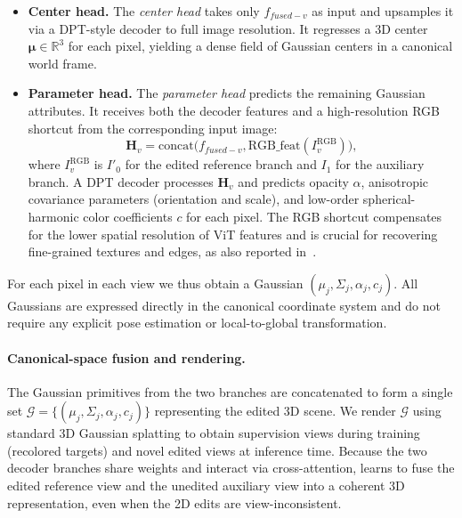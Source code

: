 \begin{itemize}
    \item \textbf{Center head.}
    The \emph{center head} takes only \(f_{fused-v}\) as input and upsamples it via a DPT-style decoder to full image resolution.
    It regresses a 3D center \(\boldsymbol{\mu} \in \mathbb{R}^3\) for each pixel, yielding a dense field of Gaussian centers in a canonical world frame.

    \item \textbf{Parameter head.}
    The \emph{parameter head} predicts the remaining Gaussian attributes.
    It receives both the decoder features and a high-resolution RGB shortcut from the corresponding input image:
    \begin{equation}
        \mathbf{H}_v = \mathrm{concat}\!\big(f_{fused-v}, \mathrm{RGB\_feat}(I_v^{\mathrm{RGB}})\big),
    \end{equation}
    where \(I_v^{\mathrm{RGB}}\) is \(I'_0\) for the edited reference branch and \(I_1\) for the auxiliary branch.
    A DPT decoder processes \(\mathbf{H}_v\) and predicts opacity \(\alpha\), anisotropic covariance parameters (orientation and scale), and low-order spherical-harmonic color coefficients \(c\) for each pixel.
    The RGB shortcut compensates for the lower spatial resolution of ViT features and is crucial for recovering fine-grained textures and edges, as also reported in~\cite{noposplat}.
\end{itemize}

For each pixel in each view we thus obtain a Gaussian
\(({\mu}_j, {\Sigma}_j, \alpha_j, c_j)\).
All Gaussians are expressed directly in the canonical coordinate system and do not require any explicit pose estimation or local-to-global transformation.

\paragraph{Canonical-space fusion and rendering.}
The Gaussian primitives from the two branches are concatenated to form a single set
\(\mathcal{G} = \{(\mu_j, \Sigma_j, \alpha_j, c_j)\}\)
representing the edited 3D scene.
We render \(\mathcal{G}\) using standard 3D Gaussian splatting to obtain supervision views during training (recolored targets) and novel edited views at inference time.
Because the two decoder branches share weights and interact via cross-attention, {\ourmethod} learns to fuse the edited reference view and the unedited auxiliary view into a coherent 3D representation, even when the 2D edits are view-inconsistent.

